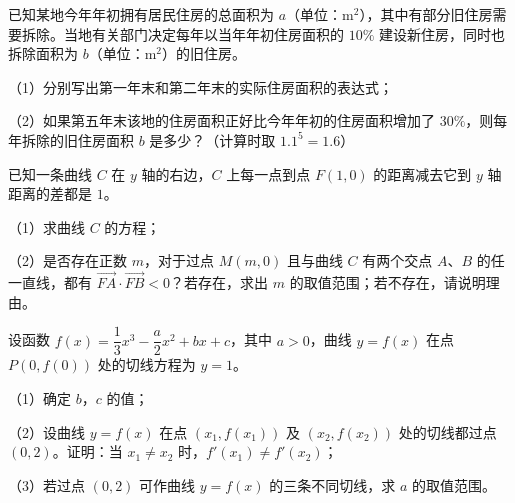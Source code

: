 \endgroup
\begin{question}
已知某地今年年初拥有居民住房的总面积为 $a$（单位：$\mathrm{m}^2$），其中有部分旧住房需要拆除。当地有关部门决定每年以当年年初住房面积的 $10\%$ 建设新住房，同时也拆除面积为 $b$（单位：$\mathrm{m}^2$）的旧住房。

（1）分别写出第一年末和第二年末的实际住房面积的表达式；

（2）如果第五年末该地的住房面积正好比今年年初的住房面积增加了 $30\%$，则每年拆除的旧住房面积 $b$ 是多少？（计算时取 $1.1^5=1.6$）

\end{question}
\begin{question}
已知一条曲线 $C$ 在 $y$ 轴的右边，$C$ 上每一点到点 $F(1,0)$ 的距离减去它到 $y$ 轴距离的差都是 $1$。

（1）求曲线 $C$ 的方程；

（2）是否存在正数 $m$，对于过点 $M(m,0)$ 且与曲线 $C$ 有两个交点 $A$、$B$ 的任一直线，都有 $\overrightarrow{FA}\cdot\overrightarrow{FB}<0$？若存在，求出 $m$ 的取值范围；若不存在，请说明理由。

\end{question}
\begin{question}
设函数 $f(x)=\dfrac13x^3-\dfrac a2x^2+bx+c$，其中 $a>0$，曲线 $y=f(x)$ 在点 $P(0,f(0))$ 处的切线方程为 $y=1$。

（1）确定 $b$，$c$ 的值；

（2）设曲线 $y=f(x)$ 在点 $(x_1,f(x_1))$ 及 $(x_2,f(x_2))$ 处的切线都过点 $(0,2)$。证明：当 $x_1\neq x_2$ 时，$f'(x_1)\neq f'(x_2)$；

（3）若过点 $(0,2)$ 可作曲线 $y=f(x)$ 的三条不同切线，求 $a$ 的取值范围。

\end{question}
